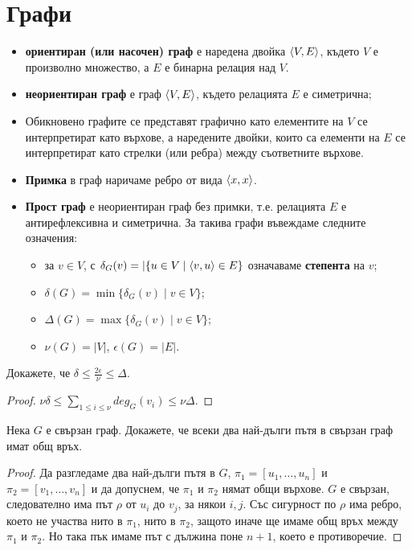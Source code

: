 \section{Графи}
\begin{itemize}
\item
  {\bf ориентиран (или насочен) граф} е наредена двойка $\langle{V,E}\rangle$, където $V$ е произволно множество,
  а $E$ е бинарна релация над $V$.
\item
  {\bf неориентиран граф} е граф $\langle{V,E}\rangle$, където релацията $E$ е симетрична;
\item
  Обикновено графите се представят графично като елементите на $V$ се интерпретират като върхове,
  а наредените двойки, които са елементи на $E$ се интерпретират като стрелки (или ребра) между съответните върхове.
\item
  {\bf Примка} в граф наричаме ребро от вида $\langle{x,x}\rangle$.
\item
  {\bf Прост граф} е неориентиран граф без примки, т.е. релацията $E$ е антирефлексивна и симетрична.
  За такива графи въвеждаме следните означения:
  \begin{itemize}
  \item 
    за $v \in V$, с $\delta_G(v) = |\{u \in V \mid \langle{v,u}\rangle \in E\}$ 
    означаваме {\bf степента} на $v$;
  \item
    $\delta(G) = \min\{\delta_G(v) \mid v \in V\}$;
  \item
    $\Delta(G) = \max\{\delta_G(v) \mid v \in V\}$;
  \item
    $\nu(G) = |V|$, $\epsilon(G) = |E|$.
  \end{itemize}
\end{itemize}

\begin{problem}
  Докажете, че $\delta \leq \frac{2\epsilon}{\nu} \leq \Delta$.
\end{problem}
\begin{proof}
  $\nu\delta \leq\sum_{1\leq i \leq\nu} deg_G(v_i) \leq \nu\Delta$.
\end{proof}

\begin{problem}
  Нека $G$ е свързан граф.
  Докажете, че всеки два най-дълги пътя в свързан граф имат общ връх.
\end{problem}
\begin{proof}
  Да разгледаме два най-дълги пътя в $G$, $\pi_1 = [u_1,\dots,u_n]$ и $\pi_2 = [v_1,\dots,v_n]$ и да допуснем, че $\pi_1$ и $\pi_2$
  нямат общи върхове.
  $G$ е свързан, следователно има път $\rho$ от $u_i$ до $v_j$, за някои $i,j$.
  Със сигурност по $\rho$ има ребро, което не участва нито в $\pi_1$, нито в $\pi_2$, защото иначе ще имаме общ връх между $\pi_1$ и $\pi_2$.
  Но така пък имаме път с дължина поне $n+1$, което е противоречие.
\end{proof}

